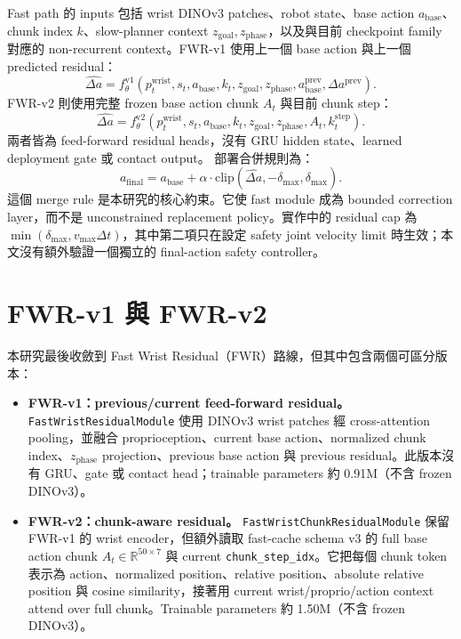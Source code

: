\documentclass[12pt,a4paper,oneside]{report}
\newcommand{\abase}{a_{\mathrm{base}}}
\newcommand{\afinal}{a_{\mathrm{final}}}
\newcommand{\deltah}{\hat{\Delta a}}
\newcommand{\dmax}{\delta_{\max}}
\newcommand{\clip}{\mathrm{clip}}
\begin{document}
Fast path 的 inputs 包括 wrist DINOv3 patches、robot state、base action $\abase$、chunk index $k$、slow-planner context $z_{\mathrm{goal}}, z_{\mathrm{phase}}$，以及與目前 checkpoint family 對應的 non-recurrent context。FWR-v1 使用上一個 base action 與上一個 predicted residual：
\begin{equation}
  \deltah =
  f^{\mathrm{v1}}_\theta(
    p^{\mathrm{wrist}}_t, s_t, \abase, k_t,
    z_{\mathrm{goal}}, z_{\mathrm{phase}},
    a^{\mathrm{prev}}_{\mathrm{base}}, \Delta a^{\mathrm{prev}}
  ).
\end{equation}
FWR-v2 則使用完整 frozen base action chunk $A_t$ 與目前 chunk step：
\begin{equation}
  \deltah =
  f^{\mathrm{v2}}_\theta(
    p^{\mathrm{wrist}}_t, s_t, \abase, k_t,
    z_{\mathrm{goal}}, z_{\mathrm{phase}},
    A_t, k^{\mathrm{step}}_t
  ).
\end{equation}
兩者皆為 feed-forward residual heads，沒有 GRU hidden state、learned deployment gate 或 contact output。
部署合併規則為：
\begin{equation}
  \afinal =
  \abase + \alpha \cdot \clip(\deltah, -\dmax, \dmax).
  \label{eq:thesis-merge}
\end{equation}
這個 merge rule 是本研究的核心約束。它使 fast module 成為 bounded correction layer，而不是 unconstrained replacement policy。實作中的 residual cap 為 $\min(\dmax, v_{\max}\Delta t)$，其中第二項只在設定 safety joint velocity limit 時生效；本文沒有額外驗證一個獨立的 final-action safety controller。

\section{FWR-v1 與 FWR-v2}

本研究最後收斂到 Fast Wrist Residual（FWR）路線，但其中包含兩個可區分版本：
\begin{itemize}
  \item \textbf{FWR-v1：previous/current feed-forward residual。} \texttt{FastWristResidualModule} 使用 DINOv3 wrist patches 經 cross-attention pooling，並融合 proprioception、current base action、normalized chunk index、$z_{\mathrm{phase}}$ projection、previous base action 與 previous residual。此版本沒有 GRU、gate 或 contact head；trainable parameters 約 0.91M（不含 frozen DINOv3）。
  \item \textbf{FWR-v2：chunk-aware residual。} \texttt{FastWristChunkResidualModule} 保留 FWR-v1 的 wrist encoder，但額外讀取 fast-cache schema v3 的 full base action chunk $A_t\in\mathbb{R}^{50\times7}$ 與 current \texttt{chunk\_step\_idx}。它把每個 chunk token 表示為 action、normalized position、relative position、absolute relative position 與 cosine similarity，接著用 current wrist/proprio/action context attend over full chunk。Trainable parameters 約 1.50M（不含 frozen DINOv3）。
\end{itemize}
\end{document}
